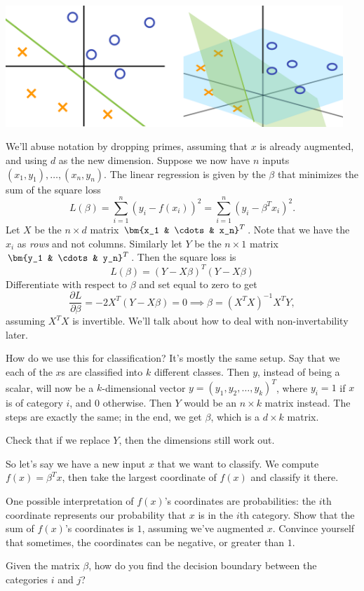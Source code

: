 \documentclass[11pt,paper=letter]{scrartcl}
\begin{document}
\begin{center}
  \includegraphics[height=1.8in]{8.png}
\end{center}

We'll abuse notation by dropping primes, assuming that $x$ is already augmented, and using $d$ as the new dimension. Suppose we now have $n$ inputs $(x_1, y_1), \ldots, (x_n, y_n)$. The linear regression is given by the $\beta$ that minimizes the sum of the square loss\[
  L(\beta) = \sum_{i=1}^n \left(y_i - f(x_i)\right)^2 = \sum_{i=1}^n\left(y_i - \beta^Tx_i\right)^2.
\]
Let $X$ be the $n \times d$ matrix $\bm{x_1 & \cdots & x_n}^T$. Note that we have the $x_i$ as \textit{rows} and not columns. Similarly let $Y$ be the $n \times 1$ matrix $\bm{y_1 & \cdots & y_n}^T$. Then the square loss is\[
  L(\beta) = (Y - X\beta)^T(Y - X\beta) %
\]
Differentiate with respect to $\beta$ and set equal to zero to get\[
  \frac{\partial L}{\partial \beta} = -2X^T(Y - X\beta) = 0 \implies \beta = (X^TX)^{-1}X^TY, %
\]
assuming $X^TX$ is invertible. We'll talk about how to deal with non-invertability later.

How do we use this for classification? It's mostly the same setup. Say that we each of the $x$s are classified into $k$ different classes. Then $y$, instead of being a scalar, will now be a $k$-dimensional vector $y = (y_1, y_2, \ldots, y_k)^T$, where $y_i = 1$ if $x$ is of category $i$, and $0$ otherwise. Then $Y$ would be an $n \times k$ matrix instead. The steps are exactly the same; in the end, we get $\beta$, which is a $d \times k$ matrix.
\begin{exrboxed}
  Check that if we replace $Y$, then the dimensions still work out.
\end{exrboxed}
So let's say we have a new input $x$ that we want to classify. We compute $f(x) = \beta^Tx$, then take the largest coordinate of $f(x)$ and classify it there.
\begin{exrboxed}
  One possible interpretation of $f(x)$'s coordinates are probabilities: the $i$th coordinate represents our probability that $x$ is in the $i$th category. Show that the sum of $f(x)$'s coordinates is $1$, assuming we've augmented $x$. Convince yourself that sometimes, the coordinates can be negative, or greater than $1$.
\end{exrboxed}
\vspace{-1em}
\begin{exrboxed}
  Given the matrix $\beta$, how do you find the decision boundary between the categories $i$ and $j$?
\end{exrboxed}
\end{document}
